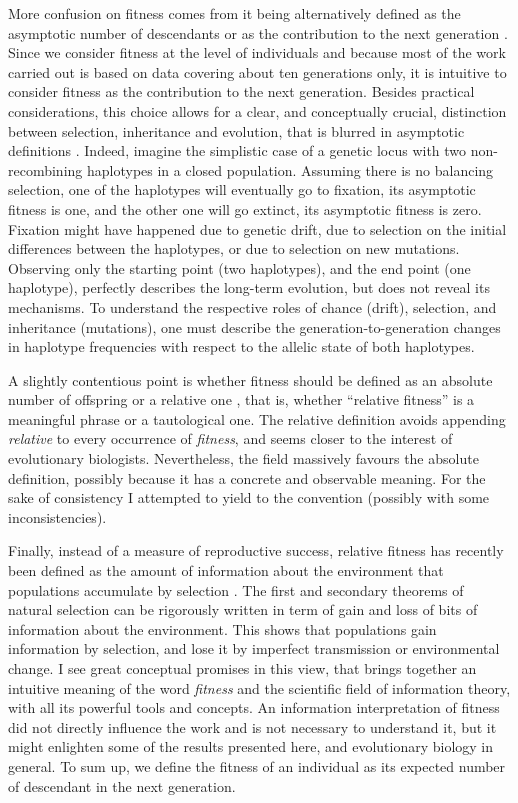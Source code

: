 More confusion on fitness comes from it being alternatively defined as the asymptotic number of descendants or as the contribution to the next generation \parencite{Wade2006}. Since we consider fitness at the level of individuals and because most of the work carried out is based on data covering about ten generations only, it is intuitive to consider fitness as the contribution to the next generation. Besides practical considerations, this choice allows for a clear, and conceptually crucial, distinction between selection, inheritance and evolution, that is blurred in asymptotic definitions \parencite{Fisher1930, Arnold1984}. Indeed, imagine the simplistic case of a genetic locus with two non-recombining haplotypes in a closed population. Assuming there is no balancing selection, one of the haplotypes will eventually go to fixation, its asymptotic fitness is one, and the other one will go extinct, its asymptotic fitness is zero. Fixation might have happened due to genetic drift, due to selection on the initial differences between the haplotypes, or due to selection on new mutations. Observing only the starting point (two haplotypes), and the end point (one haplotype), perfectly describes the long-term evolution, but does not reveal its mechanisms. To understand the respective roles of chance (drift), selection, and inheritance (mutations), one must describe the generation-to-generation changes in haplotype frequencies with respect to the allelic state of both haplotypes. 

A slightly contentious point is whether fitness should be defined as an absolute number of offspring \parencite{Wade2006} or a relative one \parencite{Rousset2004}, that is, whether ``relative fitness'' is a meaningful phrase or a tautological one. The relative definition avoids appending \emph{relative} to every occurrence of \emph{fitness}, and seems closer to the interest of evolutionary biologists. Nevertheless, the field massively favours the absolute definition, possibly because it has a concrete and observable meaning. For the sake of consistency I attempted to yield to the convention (possibly with some inconsistencies). 

Finally, instead of a measure of reproductive success, relative fitness has recently been defined as the amount of information about the environment that populations accumulate by selection \parencite{Frank2012V}. The first and secondary theorems of natural selection can be rigorously written in term of gain and loss of bits of information about the environment. This shows that populations gain information by selection, and lose it by imperfect transmission or environmental change. 
I see great conceptual promises in this view, that brings together an intuitive meaning of the word \emph{fitness} and the scientific field of information theory, with all its powerful tools and concepts. 
An information interpretation of fitness did not directly influence the work and is not necessary to understand it, but it might enlighten some of the results presented here, and evolutionary biology in general.
To sum up, we define the fitness of an individual as its expected number of descendant in the next generation.

